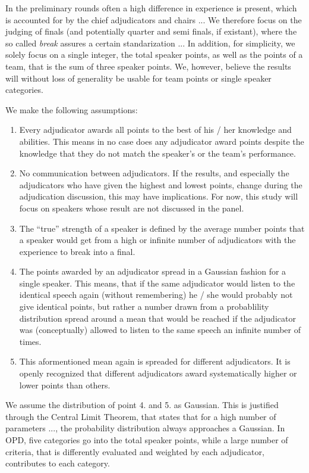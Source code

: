 \documentclass[%
 reprint,
 amsmath,amssymb,
 aps,
]{revtex4-1}
\begin{document}
In the preliminary rounds often a high difference in experience is present, which is accounted for by the chief adjudicators and chairs ...  We therefore focus on the judging of finals (and potentially quarter and semi finals, if existant), where the so called \textit{break} assures a certain standarization ... In addition, for simplicity, we solely focus on a single integer, the total speaker points, as well as the points of a team, that is the sum of three speaker points. We, however, believe the results will without loss of generality be usable for team points or single speaker categories. 

We make the following assumptions:
\begin{enumerate}
	\item Every adjudicator awards all points to the best of his / her knowledge and abilities. This means in no case does any adjudicator award points despite the knowledge that they do not match the speaker's or the team's performance. 
	\item No communication between adjudicators. If the results, and especially the adjudicators who have given the highest and lowest points, change during the adjudication discussion, this may have implications. For now, this study will focus on speakers whose result are not discussed in the panel.  
	\item The ``true'' strength of a speaker is defined by the average number points that a speaker would get from a high or infinite number of adjudicators with the experience to break into a final. 
	\item The points awarded by an adjudicator spread in a Gaussian fashion for a single speaker. This means, that if the same adjudicator would listen to the identical speech again (without remembering) he / she would probably not give identical points, but rather a number drawn from a probablility distribution spread around a mean that would be reached if the adjudicator was (conceptually) allowed to listen to the same speech an infinite number of times. 
	\item This aformentioned mean again is spreaded for different adjudicators. It is openly recognized that different adjudicators award systematically higher  or lower points than others. 
\end{enumerate}

We assume the distribution of point 4. and 5. as Gaussian. This is justified through the Central Limit Theorem, that states that for a high number of parameters ..., the probability distribution always approaches a Gaussian. In OPD, five categories go into the total speaker points, while a large number of criteria, that is differently evaluated and weighted by each adjudicator, contributes to each category. 
\end{document}
